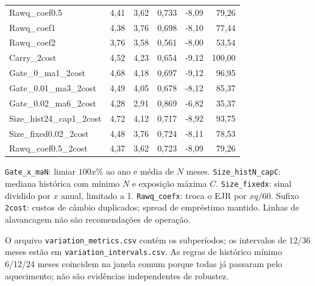 \documentclass[11pt,a4paper]{article}
\begin{document}
\begin{center}
\begin{tabular}{lrrrrr}
Rawq\_coef0.5 & 4,41 & 3,62 & 0,733 & -8,09 & 79,26 \\
Rawq\_coef1 & 4,38 & 3,76 & 0,698 & -8,10 & 77,44 \\
Rawq\_coef2 & 3,76 & 3,58 & 0,561 & -8,00 & 53,54 \\
Carry\_2cost & 4,52 & 4,23 & 0,654 & -9,12 & 100,00 \\
Gate\_0\_ma1\_2cost & 4,68 & 4,18 & 0,697 & -9,12 & 96,95 \\
Gate\_0.01\_ma3\_2cost & 4,49 & 4,05 & 0,678 & -8,12 & 85,37 \\
Gate\_0.02\_ma6\_2cost & 4,28 & 2,91 & 0,869 & -6,82 & 35,37 \\
Size\_hist24\_cap1\_2cost & 4,72 & 4,12 & 0,717 & -8,92 & 93,75 \\
Size\_fixed0.02\_2cost & 4,48 & 3,76 & 0,724 & -8,11 & 78,53 \\
Rawq\_coef0.5\_2cost & 4,37 & 3,62 & 0,723 & -8,09 & 79,26 \\
\bottomrule\end{tabular}\end{center}\normalsize

\texttt{Gate\_x\_maN}: limiar $100x$\% ao ano e média de $N$ meses. \texttt{Size\_histN\_capC}: mediana histórica com mínimo $N$ e exposição máxima $C$. \texttt{Size\_fixedx}: sinal dividido por $x$ anual, limitado a 1. \texttt{Rawq\_coefx}: troca o EJR por $xq/60$. Sufixo \texttt{2cost}: custos de câmbio duplicados; spread de empréstimo mantido. Linhas de alavancagem não são recomendações de operação.

O arquivo \texttt{variation\_metrics.csv} contém os subperíodos; os intervalos de 12/36 meses estão em \texttt{variation\_intervals.csv}. As regras de histórico mínimo 6/12/24 meses coincidem na janela comum porque todas já passaram pelo aquecimento; não são evidências independentes de robustez.

\clearpage
\end{document}
